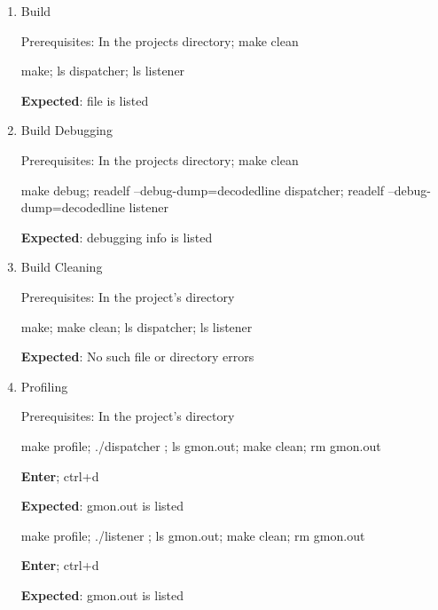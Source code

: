 \documentclass{article}
\begin{document}
\begin{enumerate}

    \item Build

    

    Prerequisites: In the projects directory; {\footnotesize make clean}

    

    {\footnotesize make; ls dispatcher; ls listener}

    

    \textbf{Expected}: file is listed

    

    \item Build Debugging

    

    Prerequisites: In the projects directory; {\footnotesize make clean}

    

    {\footnotesize make debug; readelf --debug-dump=decodedline dispatcher;  readelf --debug-dump=decodedline listener}

    

    \textbf{Expected}: debugging info is listed

    

    \item Build Cleaning

    

    Prerequisites: In the project's directory

    

    {\footnotesize make; make clean; ls dispatcher; ls listener}

    

    \textbf{Expected}: No such file or directory errors

    

    \item Profiling

    

    Prerequisites: In the project's directory

    

    {\footnotesize make profile; ./dispatcher ; ls gmon.out; make clean; rm gmon.out}

    

    \textbf{Enter}; ctrl+d

    

    \textbf{Expected}: gmon.out is listed

    

    {\footnotesize make profile; ./listener ; ls gmon.out; make clean; rm gmon.out}

    

    \textbf{Enter}; ctrl+d

    

    \textbf{Expected}: gmon.out is listed

\end{enumerate}
\end{document}
